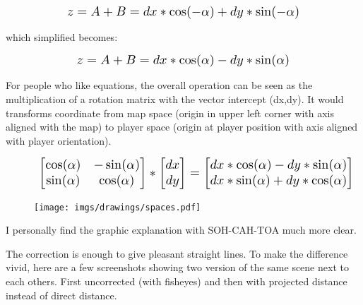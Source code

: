 \begin{figure}[H]
  \centering
  \begin{equation*}
    \scalebox{1.3}{
$z = A + B = dx * \cos(-\alpha) + dy * \sin(-\alpha) $ 
 }
  \end{equation*}
\end{figure}
which simplified becomes: 

\begin{figure}[H]
  \centering
  \begin{equation*}
    \scalebox{1.3}{
$z = A + B = dx * \cos(\alpha) - dy * \sin(\alpha) $
 }
  \end{equation*}
\end{figure}
\par
For people who like equations, the overall operation can be seen as the multiplication of a rotation matrix with the vector intercept (dx,dy). It would transforms coordinate from map space (origin in upper left corner with axis aligned with the map) to player space (origin at player position with axis aligned with player orientation).
\begin{figure}[H]
  \centering
  \begin{equation*}
    \scalebox{1.3}{
    $
      \begin{bmatrix} 
        \cos(\alpha) & -\sin(\alpha) \\ 
        \sin(\alpha) & \cos(\alpha) 
      \end{bmatrix} 
       *
      \begin{bmatrix} 
        dx \\ 
        dy 
      \end{bmatrix}
       =
      \begin{bmatrix} 
        dx*\cos(\alpha) - dy*\sin(\alpha) \\ 
        dx*\sin(\alpha) + dy*\cos(\alpha) 
      \end{bmatrix} 
      $
    }
  \end{equation*}
\end{figure}

\begin{figure}[H]
\centering
 \texttt{[image: imgs/drawings/spaces.pdf]}
 \end{figure}


I personally find the graphic explanation with SOH-CAH-TOA much more clear.\\
\par
The correction is enough to give pleasant straight lines. To make the difference vivid, here are a few screenshots showing two version of the same scene next to each others. First uncorrected (with fisheyes) and then with projected distance instead of direct distance.\\

